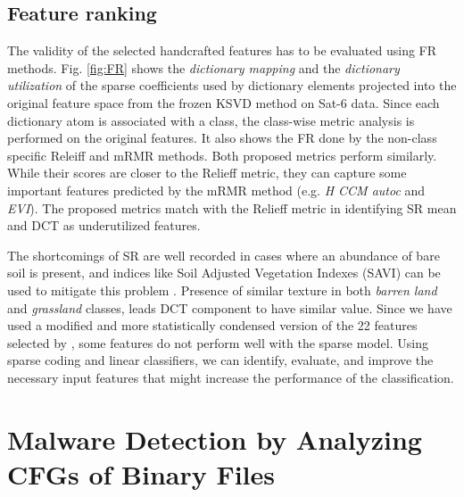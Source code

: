 \documentclass[11pt]{article}
\begin{document}
\subsection{Feature ranking}

The validity of the selected handcrafted features has to be evaluated using FR methods. Fig. \ref{fig:FR} shows the \textit{dictionary mapping} and the \textit{dictionary utilization} of the sparse coefficients used by dictionary elements projected into the original feature space from the frozen KSVD method on Sat-6 data. Since each dictionary atom is associated with a class, the class-wise metric analysis is performed on the original features. It also shows the FR done by the non-class specific Releiff and mRMR methods. Both proposed metrics perform similarly. While their scores are closer to the Relieff metric, they can capture some important features predicted by the mRMR method (e.g. \textit{H CCM autoc} and \textit{EVI}). The proposed metrics match with the Relieff metric in identifying SR mean and DCT as underutilized features.

The shortcomings of SR are well recorded in cases where an abundance of bare soil is present, and indices like Soil Adjusted Vegetation Indexes (SAVI) can be used to mitigate this problem \cite{Huete1988}. Presence of similar texture in both \textit{barren land} and \textit{grassland} classes, leads DCT component to have similar value. Since we have used a modified and more statistically condensed version of the 22 features selected by \cite{Basu2015}, some features do not perform well with the sparse model. Using sparse coding and linear classifiers, we can identify, evaluate, and improve the necessary input features that might increase the performance of the classification.

\section{Malware Detection by Analyzing CFGs of Binary Files}
\end{document}
